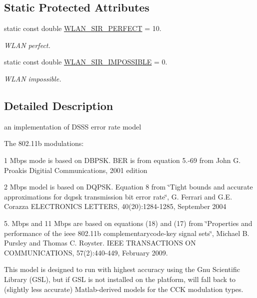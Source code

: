 \subsection*{Static Protected Attributes}
\begin{DoxyCompactItemize}
\item 
static const double \hyperlink{classns3_1_1DsssErrorRateModel_a30cb6e7959e79909c2ca9ce7170e7fc1}{W\+L\+A\+N\+\_\+\+S\+I\+R\+\_\+\+P\+E\+R\+F\+E\+CT} = 10.
\begin{DoxyCompactList}\small\item\em W\+L\+AN perfect. \end{DoxyCompactList}\item 
static const double \hyperlink{classns3_1_1DsssErrorRateModel_ab2d065a2e6978215da5fc5a1c8d74a37}{W\+L\+A\+N\+\_\+\+S\+I\+R\+\_\+\+I\+M\+P\+O\+S\+S\+I\+B\+LE} = 0.
\begin{DoxyCompactList}\small\item\em W\+L\+AN impossible. \end{DoxyCompactList}\end{DoxyCompactItemize}


\subsection{Detailed Description}
an implementation of D\+S\+SS error rate model

The 802.\+11b modulations\+: 


\begin{DoxyItemize}
\item 1 Mbps mode is based on D\+B\+P\+SK. B\+ER is from equation 5.-\/69 from John G. Proakis Digitial Communications, 2001 edition
\item 2 Mbps model is based on D\+Q\+P\+SK. Equation 8 from \char`\"{}\+Tight bounds and accurate
     approximations for dqpsk transmission bit error rate\char`\"{}, G. Ferrari and G.\+E. Corazza E\+L\+E\+C\+T\+R\+O\+N\+I\+CS L\+E\+T\+T\+E\+RS, 40(20)\+:1284-\/1285, September 2004
\item 5. Mbps and 11 Mbps are based on equations (18) and (17) from \char`\"{}\+Properties and
     performance of the ieee 802.\+11b complementarycode-\/key signal sets\char`\"{}, Michael B. Pursley and Thomas C. Royster. I\+E\+EE T\+R\+A\+N\+S\+A\+C\+T\+I\+O\+NS ON C\+O\+M\+M\+U\+N\+I\+C\+A\+T\+I\+O\+NS, 57(2)\+:440-\/449, February 2009.
\end{DoxyItemize}

This model is designed to run with highest accuracy using the Gnu Scientific Library (G\+SL), but if G\+SL is not installed on the platform, will fall back to (slightly less accurate) Matlab-\/derived models for the C\+CK modulation types.

